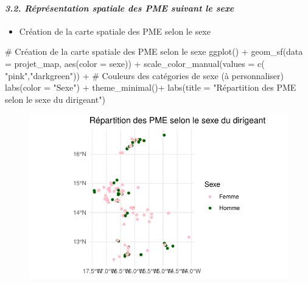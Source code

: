 \documentclass[
  letterpaper,
  DIV=11,
  numbers=noendperiod]{scrartcl}
\let\oldparagraph\paragraph
\renewcommand{\paragraph}[1]{\oldparagraph{#1}\mbox{}}
\newenvironment{Shaded}{\begin{snugshade}}{\end{snugshade}}
\newcommand{\AttributeTok}[1]{\textcolor[rgb]{0.40,0.45,0.13}{#1}}
\newcommand{\CommentTok}[1]{\textcolor[rgb]{0.37,0.37,0.37}{#1}}
\newcommand{\FunctionTok}[1]{\textcolor[rgb]{0.28,0.35,0.67}{#1}}
\newcommand{\NormalTok}[1]{\textcolor[rgb]{0.00,0.23,0.31}{#1}}
\newcommand{\SpecialCharTok}[1]{\textcolor[rgb]{0.37,0.37,0.37}{#1}}
\newcommand{\StringTok}[1]{\textcolor[rgb]{0.13,0.47,0.30}{#1}}
\providecommand{\tightlist}{%
  \setlength{\itemsep}{0pt}\setlength{\parskip}{0pt}}\usepackage{longtable,booktabs,array}
\begin{document}
\hypertarget{ruxe9pruxe9sentation-spatiale-des-pme-suivant-le-sexe}{%
\paragraph{\texorpdfstring{\emph{3.2. Réprésentation spatiale des PME
suivant le
sexe}}{3.2. Réprésentation spatiale des PME suivant le sexe}}\label{ruxe9pruxe9sentation-spatiale-des-pme-suivant-le-sexe}}

\begin{itemize}
\tightlist
\item
  Création de la carte spatiale des PME selon le sexe
\end{itemize}

\begin{Shaded}
\begin{Highlighting}[]
\CommentTok{\# Création de la carte spatiale des PME selon le sexe}
\FunctionTok{ggplot}\NormalTok{() }\SpecialCharTok{+}
  \FunctionTok{geom\_sf}\NormalTok{(}\AttributeTok{data =}\NormalTok{ projet\_map, }\FunctionTok{aes}\NormalTok{(}\AttributeTok{color =}\NormalTok{ sexe)) }\SpecialCharTok{+}
  \FunctionTok{scale\_color\_manual}\NormalTok{(}\AttributeTok{values =} \FunctionTok{c}\NormalTok{( }\StringTok{"pink"}\NormalTok{,}\StringTok{"darkgreen"}\NormalTok{)) }\SpecialCharTok{+}  \CommentTok{\# Couleurs des catégories de sexe (à personnaliser)}
  \FunctionTok{labs}\NormalTok{(}\AttributeTok{color =} \StringTok{"Sexe"}\NormalTok{) }\SpecialCharTok{+}
  \FunctionTok{theme\_minimal}\NormalTok{()}\SpecialCharTok{+}
  \FunctionTok{labs}\NormalTok{(}\AttributeTok{title =} \StringTok{"Répartition des PME selon le sexe du dirigeant"}\NormalTok{)}
\end{Highlighting}
\end{Shaded}

\begin{figure}[H]

{\centering \includegraphics{projet_R_files/figure-pdf/unnamed-chunk-37-1.pdf}

}

\end{figure}
\end{document}
